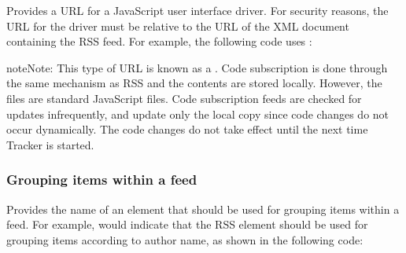 \documentclass[letterpaper,12pt,english,openany,oneside]{sphinxmanual}
\begin{document}
Provides a URL for a JavaScript user interface driver. For security reasons, the URL for the driver must be relative to the URL of the XML document containing the RSS feed. For example, the following code uses  :

\begin{sphinxVerbatim}[commandchars=\\\{\}]
\end{sphinxVerbatim}

\begin{sphinxadmonition}{note}{Note:}
This type of URL is known as a  . Code subscription is done through the same mechanism as RSS and the contents are stored locally. However, the files are standard JavaScript files. Code subscription feeds are checked for updates infrequently, and update only the local copy since code changes do not occur dynamically. The code changes do not take effect until the next time Tracker is started.
\end{sphinxadmonition}


\subsubsection{Grouping items within a feed}
\label{\detokenize{Tracker_InboxAPI:grouping-items-within-a-feed}}
\begin{sphinxVerbatim}[commandchars=\\\{\}]

\end{sphinxVerbatim}

Provides the name of an element that should be used for grouping items within a feed. For example,  would indicate that the RSS  element should be used for grouping items according to author name, as shown in the following code:

\begin{sphinxVerbatim}[commandchars=\\\{\}]
\end{sphinxVerbatim}
\end{document}
